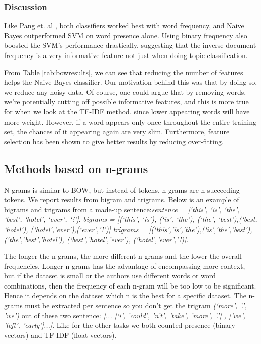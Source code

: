 \documentclass{article}
\begin{document}
\subsubsection{Discussion}
Like Pang et. al \cite{pangetal}, both classifiers worked best with word frequency, and Naive Bayes outperformed SVM on word presence alone. Using binary frequency also boosted the SVM's performance drastically, suggesting that the inverse document frequency is a very informative feature not just when doing topic classification. 

From Table \ref{tab:bowresults}, we can see that reducing the number of features helps the Naive Bayes classifier. Our motivation behind this was that by doing so, we reduce any noisy data. Of course, one could argue that by removing words, we're potentially cutting off possible informative features, and this is more true for when we look at the TF-IDF method, since lower appearing words will have more weight. However, if a word appears only once throughout the entire training set, the chances of it appearing again are very slim. Furthermore, feature selection has been shown to give better results by reducing over-fitting. 


\subsection{Methods based on n-grams}
N-grams is similar to BOW, but instead of tokens, n-grams are n succeeding tokens. We report results from bigram and trigrams. Below is an example of bigrams and trigrams from a made-up sentence:\textit{sentence = [`this', `is', `the', `best', `hotel', `ever', `!']}. \textit{bigrams = [(`this', `is'), (`is', `the'), (`the', `best'),(`best, `hotel'), (`hotel','ever'),(`ever','!')]} \textit{trigrams = [(`this','is','the'),(`is','the','best'), (`the','best','hotel'), (`best','hotel','ever'), (`hotel','ever','!)].}

The longer the n-grams, the more different n-grams and the lower the overall frequencies. Longer n-grams has the advantage of encompassing more context, but if the dataset is small or the authors use different words or word combinations, then the frequency of each n-gram will be too low to be significant. Hence it depends on the dataset which n is the best for a specific dataset. The n-grams must be extracted per sentence so you don't get the trigram \textit{(`more', '.', 'we')} out of these two sentence: \textit{[... [`i', 'could', 'n't', 'take', 'more', '.'] , ['we', 'left', 'early']...]}. Like for the other tasks we both counted presence (binary vectors) and TF-IDF (float vectors). 
\end{document}
